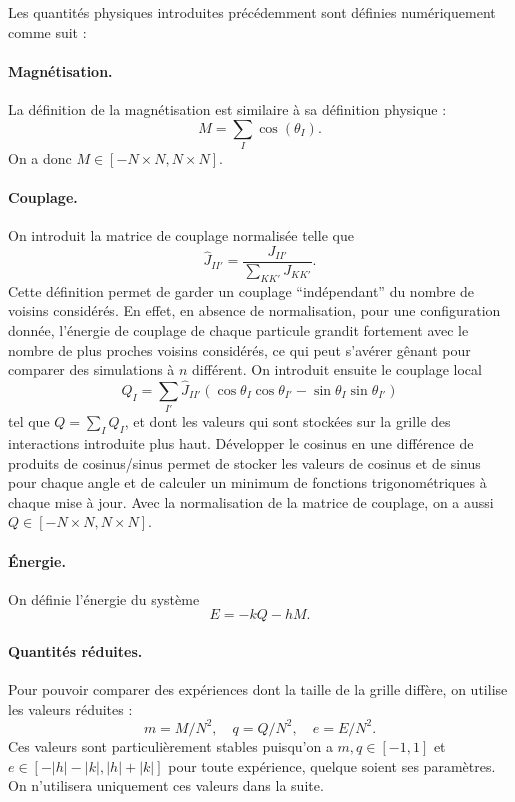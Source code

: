 \documentclass[a4paper, 11pt]{article}
\begin{document}
Les quantités physiques introduites précédemment sont définies numériquement comme suit :
\paragraph{Magnétisation.}
La définition de la magnétisation est similaire à sa définition physique : 
\[
M = \sum_I \cos(\theta_I).
\] On a donc $M \in [-N\times N, N \times N]$.
\paragraph{Couplage.}
On introduit la matrice de couplage normalisée telle que
\begin{equation*}
    \hat{J}_{II'} = \frac{J_{II'}}{\sum_{KK'} J_{KK'} }.
\end{equation*}
Cette définition permet de garder un couplage ``indépendant'' du nombre de voisins considérés.  En
effet, en absence de normalisation, pour une configuration donnée, l'énergie de couplage de chaque
particule grandit fortement avec le nombre de plus proches voisins considérés, ce qui peut s'avérer
gênant pour comparer des simulations à $n$ différent.  On introduit ensuite le couplage local 
\begin{equation*}
    Q_I = \sum_{I'} \hat{J}_{II'} ( \cos \theta_I \cos \theta_{I'}  -
    \sin \theta_I \sin \theta_{I'} )
\end{equation*}
tel que $Q = \sum_I Q_I$, et dont les valeurs qui sont stockées sur la grille des interactions
introduite plus haut. Développer le cosinus en une différence de produits de cosinus/sinus permet de
stocker les valeurs de cosinus et de sinus pour chaque angle et de calculer un minimum de fonctions
trigonométriques à chaque mise à jour. Avec la normalisation de la matrice de couplage, on a aussi
$Q \in [-N\times N, N \times N]$.
\paragraph{Énergie.} On définie l'énergie du système 
\begin{equation*}
    E = -k Q - h M.
\end{equation*}

\paragraph{Quantités réduites.} Pour pouvoir comparer des expériences dont la taille de la grille
diffère, on utilise les valeurs réduites :
\begin{equation*}
    m = M / N^2, \quad q = Q / N^2, \quad e = E / N^2.
\end{equation*}
Ces valeurs sont particulièrement stables puisqu'on a $m,q \in [-1, 1]$ et $e \in [-|h|-|k|,
|h|+|k|]$ pour toute expérience, quelque soient ses paramètres. On n'utilisera uniquement ces
valeurs dans la suite.
\end{document}
